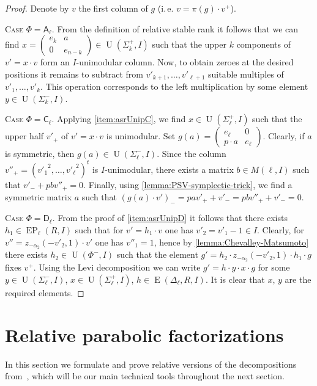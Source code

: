 \documentclass[11pt]{amsart}
\theoremstyle{plain}
\numberwithin{equation}{section}
\numberwithin{lemma}{section}
\theoremstyle{definition}
\theoremstyle{remark}
\DeclareMathOperator{\E}{E}
\DeclareMathOperator{\EP}{EP}
\DeclareMathOperator{\U}{U}
\newcommand{\rA}{\mathsf{A}}
\newcommand{\rC}{\mathsf{C}}
\newcommand{\rD}{\mathsf{D}}
\begin{document}
\begin{proof} Denote by $v$ the first column of $g$ (i.\,e. $v=\pi(g)\cdot v^+$).

\textsc{Case $\Phi=\rA_\ell$.} From the definition of relative stable rank it follows that we can find 
$x= \left(\begin{smallmatrix} e_k & a \\ 0 & e_{n-k} \end{smallmatrix}\right) \in \U(\Sigma_k^+, I)$ such that 
the upper $k$ components of $v'= x \cdot v$ form an $I$-unimodular column. 
Now, to obtain zeroes at the desired positions it remains to subtract from $v'_{k+1},\ldots, v'_{\ell+1}$ suitable multiples of $v'_1, \ldots, v'_k$.
This operation corresponds to the left multiplication by some element $y\in\U(\Sigma_k^-, I)$.

\textsc{Case $\Phi=\rC_\ell$.} 
Applying \cref{item:asrUnipC}, we find $x \in \U(\Sigma_\ell^+, I)$ such that the upper half $v'_+$ of $v' = x \cdot v$ is unimodular.
Set $g(a) = \left(\begin{smallmatrix} e_\ell & 0 \\ p \cdot a & e_{\ell} \end{smallmatrix}\right)$.
Clearly, if $a$ is symmetric, then $g(a) \in \U(\Sigma_\ell^-, I)$.
Since the column $v''_+ = ({v'_1}^2, \ldots, {v'_\ell}^2)^t$ is $I$-unimodular, there exists a matrix $b \in M(\ell, I)$ such that $v'_- + p b v''_+ = 0$.
Finally, using \cref{lemma:PSV-symplectic-trick}, we find a symmetric matrix $a$ such that $(g(a) \cdot v')_- = p a v'_+ + v'_- = p b v''_+ + v'_- = 0$.

\textsc{Case $\Phi=\rD_\ell$.} From the proof of \cref{item:asrUnipD} it follows that there exists $h_1 \in \EP_\ell(R, I)$ such that for $v'=h_1\cdot v$ one has $v'_2=v'_1-1\in I$.
Clearly, for $v'' = z_{-\alpha_{2}}(-v'_2, 1)\cdot v'$ one has $v''_1=1$, hence by \cref{lemma:Chevalley-Matsumoto} there exists $h_2 \in \U(\Phi^-, I)$ such that the element
$g'=h_2 \cdot z_{-\alpha_{2}}(-v'_2, 1) \cdot h_1 \cdot g$ fixes $v^+$. 
Using the Levi decomposition we can write $g'=h \cdot y \cdot x \cdot g$ for some $y\in\U(\Sigma^-_\ell, I)$, $x \in \U(\Sigma^+_\ell, I)$, $h\in\E(\Delta_\ell, R, I)$.
It is clear that $x$, $y$ are the required elements.
\end{proof}

\section{Relative parabolic factorizations} \label{sec:factorizations}
In this section we formulate and prove relative versions of the decompositions from~\cite{St78}, which will be our main technical tools throughout the next section.
\end{document}
